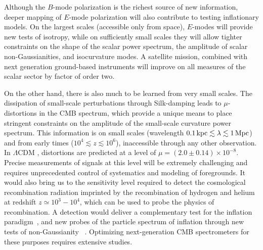 Although the $B$-mode polarization is the richest source of new information, deeper mapping of $E$-mode polarization will also contribute to testing inflationary models. On the largest scales (accessible only from space), $E$-modes will provide new tests of isotropy, while on sufficiently small scales they will allow tighter constraints on the shape of the scalar power spectrum, the amplitude of scalar non-Gaussianities, and isocurvature modes. A satellite mission, combined with next generation ground-based instruments will improve on all measures of the scalar sector by factor of order two.

On the other hand, there is also much to be learned from very small scales. The dissipation of small-scale perturbations through Silk-damping \citep{Sunyaev1970diss, Daly1991, Hu1994, Chluba2012} leads to $\mu$-distortions in the CMB spectrum, which provide a unique means to place stringent constraints on the amplitude of the small-scale curvature power spectrum. This information is on small scales (wavelength $0.1 \,{\rm kpc} \lesssim \lambda \lesssim 1\, {\rm Mpc}$) and from early times ($10^4 \lesssim z\lesssim 10^6$), inaccessible through any other observation. In $\Lambda$CDM \citep{Chluba2016LCDM}, distortions are predicted at a level of $\mu=(2.0\pm0.14)\times 10^{-8}$. Precise measurements of signals at this level will be extremely challenging and requires unprecedented control of systematics and modeling of foregrounds. It would also bring us to the sensitivity level required to detect the cosmological recombination radiation \citep{Sunyaev2009, Chluba2016} imprinted by the recombination of hydrogen and helium at redshift $z\simeq 10^3-10^4$, which can be used to probe the physics of recombination. A detection would deliver a complementary test for the inflation paradigm~\citep{Chluba2012inflaton, Dent2012, Chluba2013PCA, Clesse2014, Cabass2016}, and new probes of the particle spectrum of inflation through new tests of non-Gaussianity ~\citep{Pajer2012, Ganc2012, Biagetti2013, Razi2015}. Optimizing next-generation CMB spectrometers for these purposes requires extensive studies.

